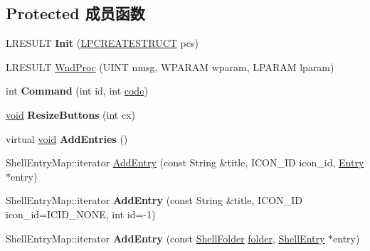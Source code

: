 \subsection*{Protected 成员函数}
\begin{DoxyCompactItemize}
\item 
\mbox{\label{struct_start_menu_a64b3dfc79f4e26e0aa0c7413d235a8d0}} 
L\+R\+E\+S\+U\+LT {\bfseries Init} (\hyperlink{structtag_c_r_e_a_t_e_s_t_r_u_c_t_a}{L\+P\+C\+R\+E\+A\+T\+E\+S\+T\+R\+U\+CT} pcs)
\item 
L\+R\+E\+S\+U\+LT \hyperlink{struct_start_menu_a12aaba6be3ac789748b012dffac0cacd}{Wnd\+Proc} (U\+I\+NT nmsg, W\+P\+A\+R\+AM wparam, L\+P\+A\+R\+AM lparam)
\item 
\mbox{\label{struct_start_menu_a8e1b728f1a9fed1037e674d48fbeb58e}} 
int {\bfseries Command} (int id, int \hyperlink{structcode}{code})
\item 
\mbox{\label{struct_start_menu_a38cda378c21fe2a30fc86ae89d94b91c}} 
\hyperlink{interfacevoid}{void} {\bfseries Resize\+Buttons} (int cx)
\item 
\mbox{\label{struct_start_menu_ae39319eb67abd395ce3f5098ff63c68f}} 
virtual \hyperlink{interfacevoid}{void} {\bfseries Add\+Entries} ()
\item 
Shell\+Entry\+Map\+::iterator \hyperlink{struct_start_menu_a3649f39dcdb77983e7f3e4de8bc9d1bf}{Add\+Entry} (const String \&title, I\+C\+O\+N\+\_\+\+ID icon\+\_\+id, \hyperlink{struct_entry}{Entry} $\ast$entry)
\item 
\mbox{\label{struct_start_menu_aee9e06b22c8e77eece05dc4ecdc4103c}} 
Shell\+Entry\+Map\+::iterator {\bfseries Add\+Entry} (const String \&title, I\+C\+O\+N\+\_\+\+ID icon\+\_\+id=I\+C\+I\+D\+\_\+\+N\+O\+NE, int id=-\/1)
\item 
\mbox{\label{struct_start_menu_a0f450d8140d1b3500e31b1f8c0f8842d}} 
Shell\+Entry\+Map\+::iterator {\bfseries Add\+Entry} (const \hyperlink{struct_shell_folder}{Shell\+Folder} \hyperlink{structfolder}{folder}, \hyperlink{struct_shell_entry}{Shell\+Entry} $\ast$entry)
\item 
\mbox{\label{struct_start_menu_aabdb13dccbb9e66362903ae5f1e7668c}} 

\end{DoxyCompactItemize}
